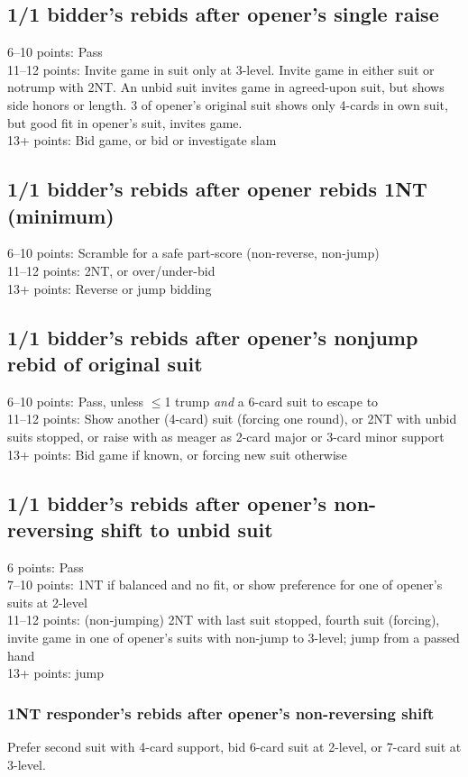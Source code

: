 \documentclass[oneside]{memoir}
\let\TeXle\le
\def\le{$\TeXle$}
\begin{document}
\subsection{1/1 bidder's rebids after opener's single raise}
6--10 points: Pass\\
11--12 points: Invite game in suit only at 3-level.  Invite game in either
suit or notrump with 2NT.  An unbid suit invites game in agreed-upon suit,
but shows side honors or length.  3 of opener's original suit shows only
4-cards in own suit, but good fit in opener's suit, invites game.\\
13+ points: Bid game, or bid or investigate slam

\subsection{1/1 bidder's rebids after opener rebids 1NT (minimum)}
6--10 points: Scramble for a safe part-score (non-reverse, non-jump)\\
11--12 points: 2NT, or over/under-bid\\
13+ points: Reverse or jump bidding

\subsection{1/1 bidder's rebids after opener's nonjump rebid of original suit}
6--10 points: Pass, unless \le1 trump \emph{and} a 6-card suit to escape to\\
11--12 points: Show another (4-card) suit (forcing one round), or 2NT with
unbid suits stopped, or raise with as meager as 2-card major or 3-card minor 
support\\
13+ points: Bid game if known, or forcing new suit otherwise

\subsection{1/1 bidder's rebids after opener's non-reversing shift to unbid suit}
6 points: Pass\\
7--10 points: 1NT if balanced and no fit, or show preference for one of opener's suits at 2-level\\
11--12 points: (non-jumping) 2NT with last suit stopped, fourth suit (forcing),
invite game in one of opener's suits with non-jump to 3-level; jump from a 
passed hand\\
13+ points: jump
\subsubsection{1NT responder's rebids after opener's non-reversing shift}
Prefer second suit with 4-card support, bid 6-card suit at 2-level, or 7-card
suit at 3-level.
\end{document}
